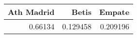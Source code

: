 \begin{tabular}{rrr}
\hline
   Ath Madrid &    Betis &   Empate \\
\hline
      0.66134 & 0.129458 & 0.209196 \\
\hline
\end{tabular}